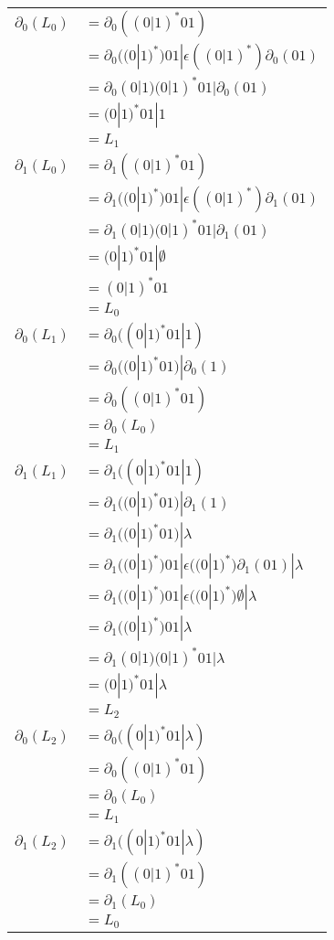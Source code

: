 \subsubsection{}
\begin{tabular}{l l}
	$\partial_0(L_0)$ & $= \partial_0((0|1)^*01)$ \\
					  & $= \partial_0((0|1)^*)01 | \epsilon((0|1)^*)\partial_0(01)$ \\
					  & $= \partial_0(0|1)(0|1)^*01 | \partial_0(01)$ \\
					  & $= (0|1)^*01 | 1$ \\
					  & $= L_1$ \\

	$\partial_1(L_0)$ & $= \partial_1((0|1)^*01)$ \\
					  & $= \partial_1((0|1)^*)01 | \epsilon((0|1)^*)\partial_1(01)$ \\
					  & $= \partial_1(0|1)(0|1)^*01 | \partial_1(01)$ \\
					  & $= (0|1)^*01 | \emptyset$ \\
					  & $= (0|1)^*01$ \\
					  & $= L_0$ \\

	$\partial_0(L_1)$ & $= \partial_0((0|1)^*01 | 1)$ \\
					  & $= \partial_0((0|1)^*01) | \partial_0(1)$ \\
					  & $= \partial_0((0|1)^*01)$ \\
					  & $= \partial_0(L_0)$ \\
					  & $= L_1$ \\

	$\partial_1(L_1)$ & $= \partial_1((0|1)^*01 | 1)$ \\
					  & $= \partial_1((0|1)^*01) | \partial_1(1)$ \\
					  & $= \partial_1((0|1)^*01) | \lambda$ \\
					  & $= \partial_1((0|1)^*)01 | \epsilon((0|1)^*)\partial_1(01) | \lambda$ \\
					  & $= \partial_1((0|1)^*)01 | \epsilon((0|1)^*)\emptyset | \lambda$ \\
					  & $= \partial_1((0|1)^*)01 | \lambda$ \\
					  & $= \partial_1(0|1)(0|1)^*01 | \lambda$ \\
					  & $= (0|1)^*01 | \lambda$ \\
					  & $= L_2$ \\

	$\partial_0(L_2)$ & $= \partial_0((0|1)^*01 | \lambda)$ \\
					  & $= \partial_0((0|1)^*01)$ \\
					  & $= \partial_0(L_0)$ \\
					  & $= L_1$ \\

	$\partial_1(L_2)$ & $= \partial_1((0|1)^*01 | \lambda)$ \\
					  & $= \partial_1((0|1)^*01)$ \\
					  & $= \partial_1(L_0)$ \\
					  & $= L_0$ \\
\end{tabular} 

